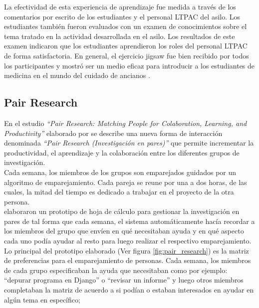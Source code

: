 La efectividad de esta experiencia de aprendizaje fue medida a través de los comentarios por escrito de los estudiantes y el personal LTPAC del asilo. Los estudiantes también fueron evaluados con un examen de conocimientos sobre el tema tratado en la actividad desarrollada en el asilo. Los resultados de este examen indicaron que los estudiantes aprendieron los roles del personal LTPAC de forma satisfactoria. En general, el ejercicio jigsaw fue bien recibido por todos los participantes y mostró ser un medio eficaz para introducir a los estudiantes de medicina en el mundo del cuidado de ancianos \cite{Buhr2014429}.\\

\subsection{Pair Research}
En el estudio \emph{``Pair Research: Matching People for Colaboration, Learning, and Productivity''} elaborado por  se describe una nueva forma de interacción denominada \emph{``Pair Research (Investigación en pares)''} que permite incrementar la productividad, el aprendizaje y la colaboración entre los diferentes grupos de investigación. \\

Cada semana, los miembros de los grupos son emparejados guidados por un algoritmo de emparejamiento. Cada pareja se reune por una a dos horas, de las cuales, la mitad del tiempo es dedicado a trabajar en el proyecto de la otra persona.\\

 elaboraron un prototipo de hoja de cálculo para gestionar la investigación en pares de tal forma que cada semana, el sistema automáticamente hacía recordar a los miembros del grupo que envíen en qué necesitaban ayuda y en qué aspecto cada uno podía ayudar al resto para luego realizar el respectivo emparejamiento. Lo principal del prototipo elaborado (Ver figura \ref{fig:pair_research}) es la matriz de preferencias para el emparejamiento de personas. Cada semana, los miembros de cada grupo especificaban la ayuda que necesitaban como por ejemplo: ``depurar programa en Django'' o ``revisar un informe'' y luego otros miembros completaban la matriz de acuerdo a si podían o estaban interesados en ayudar en algún tema en específico; \\

